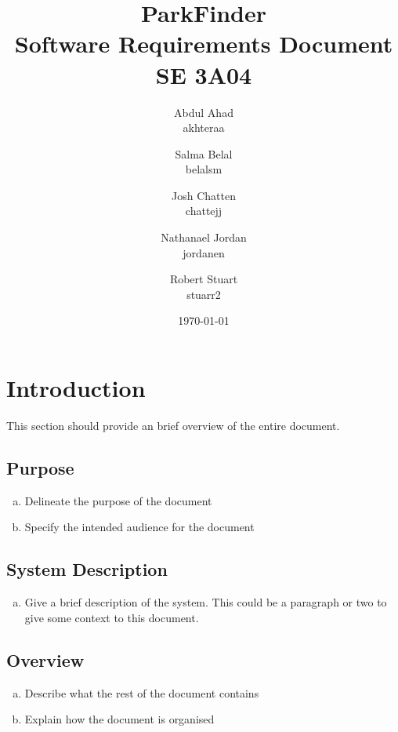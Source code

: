 \documentclass[titlepage]{article}
\title{ParkFinder\\Software Requirements Document\\SE 3A04}
\author{Abdul Ahad \\ akhteraa \and Salma Belal \\ belalsm \and Josh Chatten \\ chattejj \and
Nathanael Jordan \\ jordanen \and Robert Stuart \\ stuarr2}
\date{\today}
\begin{document}
\maketitle	
\thispagestyle{empty}
\clearpage
\setcounter{tocdepth}{2}%
\tableofcontents
\clearpage


\section{Introduction}
\label{sec:introduction}

This section should provide an brief overview of the entire document.

\subsection{Purpose}
\label{sub:purpose}
\begin{enumerate}[a)]
    \item Delineate the purpose of the document
    \item Specify the intended audience for the document
\end{enumerate}

\subsection{System Description}
\label{sub:system_description}
\begin{enumerate}[a)]
    \item Give a brief description of the system. This could be a paragraph or two to give some
    context to this document.
\end{enumerate}

\subsection{Overview}
\label{sub:overview}
\begin{enumerate}[a)]
    \item Describe what the rest of the document contains 
    \item Explain how the document is organised
\end{enumerate}

\end{document}
